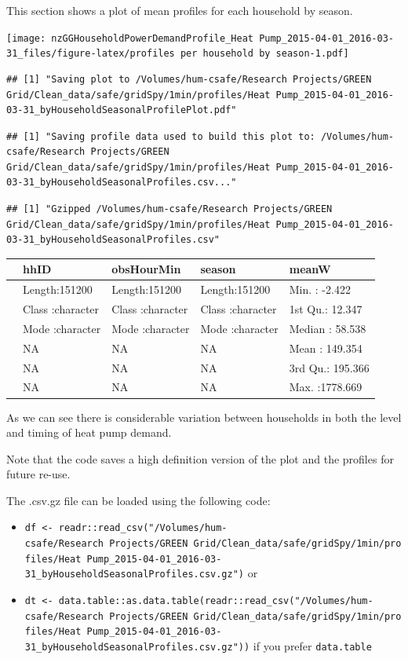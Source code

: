 \documentclass[]{article}
\providecommand{\tightlist}{%
  \setlength{\itemsep}{0pt}\setlength{\parskip}{0pt}}
\begin{document}
This section shows a plot of mean profiles for each household by season.

\texttt{[image: nzGGHouseholdPowerDemandProfile\_Heat Pump\_2015-04-01\_2016-03-31\_files/figure-latex/profiles per household by season-1.pdf]}

\begin{verbatim}
## [1] "Saving plot to /Volumes/hum-csafe/Research Projects/GREEN Grid/Clean_data/safe/gridSpy/1min/profiles/Heat Pump_2015-04-01_2016-03-31_byHouseholdSeasonalProfilePlot.pdf"
\end{verbatim}

\begin{verbatim}
## [1] "Saving profile data used to build this plot to: /Volumes/hum-csafe/Research Projects/GREEN Grid/Clean_data/safe/gridSpy/1min/profiles/Heat Pump_2015-04-01_2016-03-31_byHouseholdSeasonalProfiles.csv..."
\end{verbatim}

\begin{verbatim}
## [1] "Gzipped /Volumes/hum-csafe/Research Projects/GREEN Grid/Clean_data/safe/gridSpy/1min/profiles/Heat Pump_2015-04-01_2016-03-31_byHouseholdSeasonalProfiles.csv"
\end{verbatim}

\begin{longtable}[]{@{}lllll@{}}
\toprule
& hhID & obsHourMin & season & meanW\tabularnewline
\midrule
\endhead
& Length:151200 & Length:151200 & Length:151200 & Min. :
-2.422\tabularnewline
& Class :character & Class :character & Class :character & 1st Qu.:
12.347\tabularnewline
& Mode :character & Mode :character & Mode :character & Median :
58.538\tabularnewline
& NA & NA & NA & Mean : 149.354\tabularnewline
& NA & NA & NA & 3rd Qu.: 195.366\tabularnewline
& NA & NA & NA & Max. :1778.669\tabularnewline
\bottomrule
\end{longtable}

As we can see there is considerable variation between households in both
the level and timing of heat pump demand.

Note that the code saves a high definition version of the plot and the
profiles for future re-use.

The .csv.gz file can be loaded using the following code:

\begin{itemize}
\tightlist
\item
  \texttt{df\ \textless{}-\ readr::read\_csv("/Volumes/hum-csafe/Research\ Projects/GREEN\ Grid/Clean\_data/safe/gridSpy/1min/profiles/Heat\ Pump\_2015-04-01\_2016-03-31\_byHouseholdSeasonalProfiles.csv.gz")}
  or
\item
  \texttt{dt\ \textless{}-\ data.table::as.data.table(readr::read\_csv("/Volumes/hum-csafe/Research\ Projects/GREEN\ Grid/Clean\_data/safe/gridSpy/1min/profiles/Heat\ Pump\_2015-04-01\_2016-03-31\_byHouseholdSeasonalProfiles.csv.gz"))}
  if you prefer \texttt{data.table}
\end{itemize}
\end{document}

